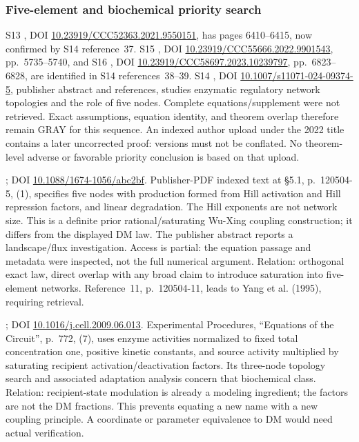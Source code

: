 \subsubsection{Five-element and biochemical priority search}
\begin{description}[style=nextline,leftmargin=0pt,labelwidth=0pt,labelsep=0pt]
\item[S13--S16: the Lin--Shi--Han enzymatic sequence is the main access gap.]
S13 \cite{LinShiHan2021}, DOI
\href{https://doi.org/10.23919/CCC52363.2021.9550151}{10.23919/CCC52363.2021.9550151},
has pages 6410--6415, now confirmed by S14 reference~37.
S15 \cite{LinShiHan2022}, DOI
\href{https://doi.org/10.23919/CCC55666.2022.9901543}{10.23919/CCC55666.2022.9901543},
pp.~5735--5740, and S16 \cite{LinHan2023}, DOI
\href{https://doi.org/10.23919/CCC58697.2023.10239797}{10.23919/CCC58697.2023.10239797},
pp.~6823--6828, are identified in S14 references~38--39.
S14 \cite{LinHan2024}, DOI
\href{https://doi.org/10.1007/s11071-024-09374-5}{10.1007/s11071-024-09374-5},
publisher abstract and references, studies enzymatic regulatory network
topologies and the role of five nodes. Complete equations/supplement
were not retrieved. Exact assumptions, equation identity, and theorem
overlap therefore remain GRAY for this sequence. An indexed author
upload under the 2022 title contains a later uncorrected proof: versions
must not be conflated. No theorem-level adverse or favorable priority
conclusion is based on that upload.

\item[S17: Zhang, Xia and Wang (2020).]
\cite{ZhangXiaWang2020}; DOI
\href{https://doi.org/10.1088/1674-1056/abc2bf}{10.1088/1674-1056/abc2bf}.
Publisher-PDF indexed text at \S5.1, p.~120504-5, (1), specifies
five nodes with production formed from Hill activation and Hill
repression factors, and linear degradation. The Hill exponents are
not network size. This is a definite prior rational/saturating Wu-Xing
coupling construction; it differs from the displayed DM law.
The publisher abstract reports a landscape/flux investigation.
Access is partial: the equation passage and metadata were inspected,
not the full numerical argument. Relation: orthogonal exact law,
direct overlap with any broad claim to introduce saturation into
five-element networks. Reference~11, p.~120504-11, leads to
Yang et al. (1995), requiring retrieval.

\item[S18: Ma et al. (2009), a backward biochemical source.]
\cite{MaEtAl2009}; DOI
\href{https://doi.org/10.1016/j.cell.2009.06.013}{10.1016/j.cell.2009.06.013}.
Experimental Procedures, ``Equations of the Circuit'', p.~772, (7),
uses enzyme activities normalized to fixed total concentration one,
positive kinetic constants, and source activity multiplied by saturating
recipient activation/deactivation factors. Its three-node topology
search and associated adaptation analysis concern that biochemical
class. Relation: recipient-state modulation is already a modeling
ingredient; the factors are not the DM fractions. This prevents
equating a new name with a new coupling principle. A coordinate or
parameter equivalence to DM would need actual verification.


\end{description}
